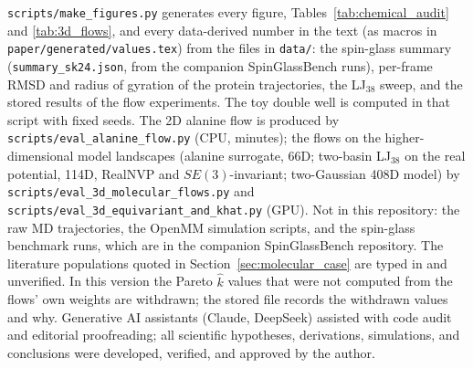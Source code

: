 \texttt{scripts/\allowbreak make\_figures.py} generates every figure, Tables~\ref{tab:chemical_audit} and \ref{tab:3d_flows}, and every data-derived number in the text (as macros in \texttt{paper/\allowbreak generated/\allowbreak values.tex}) from the files in \texttt{data/}: the spin-glass summary (\texttt{summary\_sk24.json}, from the companion SpinGlassBench runs), per-frame RMSD and radius of gyration of the protein trajectories, the LJ$_{38}$ sweep, and the stored results of the flow experiments. The toy double well is computed in that script with fixed seeds. The 2D alanine flow is produced by \texttt{scripts/\allowbreak eval\_alanine\_flow.py} (CPU, minutes); the flows on the higher-dimensional model landscapes (alanine surrogate, 66D; two-basin LJ$_{38}$ on the real potential, 114D, RealNVP and $SE(3)$-invariant; two-Gaussian 408D model) by \texttt{scripts/\allowbreak eval\_3d\_molecular\_flows.py} and \texttt{scripts/\allowbreak eval\_3d\_equivariant\_and\_khat.py} (GPU). Not in this repository: the raw MD trajectories, the OpenMM simulation scripts, and the spin-glass benchmark runs, which are in the companion SpinGlassBench repository. The literature populations quoted in Section~\ref{sec:molecular_case} are typed in and unverified. In this version the Pareto $\hat k$ values that were not computed from the flows' own weights are withdrawn; the stored file records the withdrawn values and why. Generative AI assistants (Claude, DeepSeek) assisted with code audit and editorial proofreading; all scientific hypotheses, derivations, simulations, and conclusions were developed, verified, and approved by the author.
